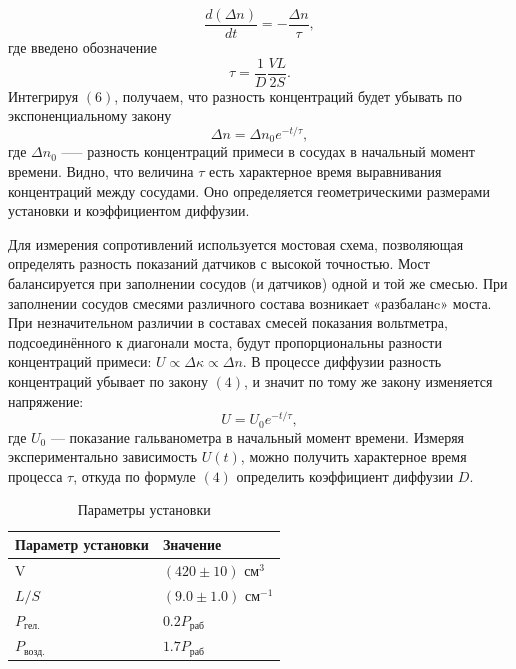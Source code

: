 \documentclass[12pt,a4paper]{article}
\begin{document}
\begin{equation}
	\dfrac{d(\Delta n)}{dt} = - \dfrac{\Delta n}{\tau},
\end{equation}
где введено обозначение
\begin{equation}
	\tau = \dfrac{1}{D} \dfrac{VL}{2S}.
\end{equation}
Интегрируя $(6)$, получаем, что разность концентраций будет убывать по экспоненциальному закону
\begin{equation}
	\Delta n = \Delta n_0 e^{-t/\tau},
\end{equation}
где $\Delta n_0$ --— разность концентраций примеси в сосудах в начальный момент времени. Видно, что величина $\tau$ есть характерное время выравнивания концентраций между сосудами. Оно определяется геометрическими размерами установки и коэффициентом диффузии.

Для измерения сопротивлений используется мостовая схема, позволяющая определять разность показаний датчиков с высокой точностью. Мост балансируется при заполнении сосудов (и датчиков) одной и той же смесью. При заполнении сосудов смесями различного состава возникает «разбаланc» моста. При незначительном различии в составах смесей показания вольтметра, подсоединённого к диагонали моста, будут пропорциональны разности концентраций примеси: $U \propto \Delta \kappa \propto \Delta n$. В процессе диффузии разность концентраций убывает по закону $(4)$, и значит по тому же закону изменяется напряжение: 
\begin{equation}
	U = U_0 e^{-t/\tau},
\end{equation}
где $U_0$ --- показание гальванометра в начальный момент времени. Измеряя экспериментально зависимость $U(t)$, можно получить характерное время процесса $\tau$, откуда по формуле $(4)$ определить коэффициент диффузии $D$.


\begin{table}[h]
\centering
\caption{Параметры установки}
\label{tab:scheme}
\footnotesize
\begin{tabular}{ll}
	
	\toprule
	Параметр установки & Значение \\
	\midrule
	V & $(420\pm10) $ $\text{см}^3$ \\
	$L/S$ & $(9.0\pm1.0)$ $ \text{см}^{-1}$ \\
	$P_{\text{гел.}}$ & $0.2 P_{\text{раб}}$ \\
	$P_{\text{возд.}}$ & $1.7 P_{\text{раб}}$ \\
	\bottomrule
	
\end{tabular}

\end{table} 
\end{document}
